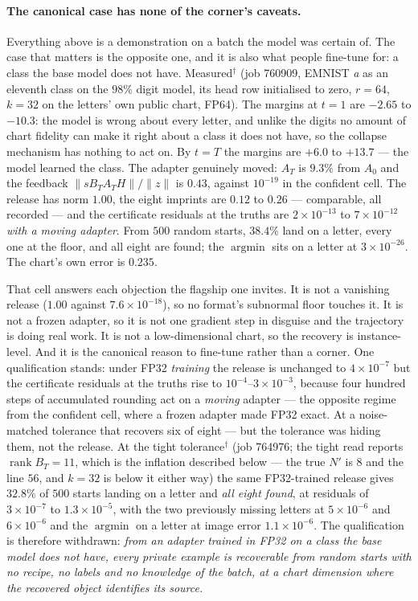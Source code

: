\paragraph{The canonical case has none of the corner's caveats.} Everything
above is a demonstration on a batch the model was certain of. The case that
matters is the opposite one, and it is also what people fine-tune for: a class
the base model does not have. Measured$^\dagger$ (job 760909, EMNIST
\emph{a} as an eleventh class on the $98\%$ digit model, its head row
initialised to zero, $r=64$, $k=32$ on the letters' own public chart, FP64).
The margins at $t=1$ are $-2.65$ to $-10.3$: the model is wrong about every
letter, and unlike the digits no amount of chart fidelity can make it right
about a class it does not have, so the collapse mechanism has nothing to act
on. By $t=T$ the margins are $+6.0$ to $+13.7$ --- the model learned the
class. The adapter genuinely moved: $A_T$ is $9.3\%$ from $A_0$ and the
feedback $\|sB_TA_TH\|/\|z\|$ is $0.43$, against $10^{-19}$ in the confident
cell. The release has norm $1.00$, the eight imprints are $0.12$ to $0.26$ ---
comparable, all recorded --- and the certificate residuals at the truths are
$2\times10^{-13}$ to $7\times10^{-12}$ \emph{with a moving adapter}. From
$500$ random starts, $38.4\%$ land on a letter, every one at the floor, and
all eight are found; the $\operatorname{argmin}$ sits on a letter at
$3\times10^{-26}$. The chart's own error is $0.235$.

That cell answers each objection the flagship one invites. It is not a
vanishing release ($1.00$ against $7.6\times10^{-18}$), so no format's
subnormal floor touches it. It is not a frozen adapter, so it is not one
gradient step in disguise and the trajectory is doing real work. It is not a
low-dimensional chart, so the recovery is instance-level. And it is the
canonical reason to fine-tune rather than a corner. One qualification stands:
under FP32 \emph{training} the release is unchanged to $4\times10^{-7}$ but
the certificate residuals at the truths rise to $10^{-4}$--$3\times10^{-3}$,
because four hundred steps of accumulated rounding act on a \emph{moving}
adapter --- the opposite regime from the confident cell, where a frozen
adapter made FP32 exact. At a noise-matched tolerance that recovers six of
eight --- but the tolerance was hiding them, not the release. At the tight
tolerance$^\dagger$ (job 764976; the tight read reports $\operatorname{rank}
B_T=11$, which is the inflation described below --- the true $N'$ is $8$ and
the line $56$, and $k=32$ is below it either way) the same FP32-trained
release gives $32.8\%$ of $500$ starts landing on a letter and \emph{all
eight found}, at residuals of $3\times10^{-7}$ to $1.3\times10^{-5}$, with the
two previously missing letters at $5\times10^{-6}$ and $6\times10^{-6}$ and
the $\operatorname{argmin}$ on a letter at image error $1.1\times10^{-6}$.
The qualification is therefore withdrawn: \emph{from an adapter trained in
FP32 on a class the base model does not have, every private example is
recoverable from random starts with no recipe, no labels and no knowledge of
the batch, at a chart dimension where the recovered object identifies its
source.}


